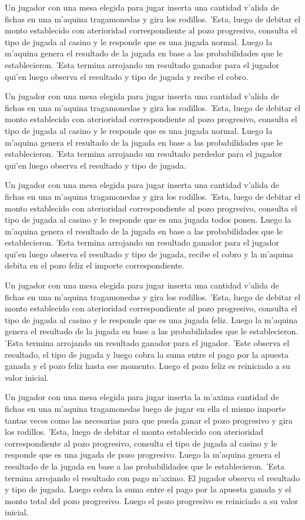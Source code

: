 \escenario
{
Un jugador con una mesa elegida para jugar inserta una cantidad v'alida de fichas en una m'aquina tragamonedas y gira los rodillos. 'Esta, luego de debitar el monto establecido con aterioridad correspondiente al pozo progresivo, consulta el tipo de jugada al casino y le responde que es una jugada normal. Luego la m'aquina genera el resultado de la jugada en base a las probabilidades que le establecieron. 'Esta termina arrojando un resultado ganador para el jugador qui'en luego observa el resultado y tipo de jugada y recibe el cobro.
}

\escenario
{
Un jugador con una mesa elegida para jugar inserta una cantidad v'alida de fichas en una m'aquina tragamonedas y gira los rodillos. 'Esta, luego de debitar el monto establecido con aterioridad correspondiente al pozo progresivo, consulta el tipo de jugada al casino y le responde que es una jugada normal. Luego la m'aquina genera el resultado de la jugada en base a las probabilidades que le establecieron. 'Esta termina arrojando un resultado perdedor para el jugador qui'en luego observa el resultado y tipo de jugada.
}

\escenario
{
Un jugador con una mesa elegida para jugar inserta una cantidad v'alida de fichas en una m'aquina tragamonedas y gira los rodillos. 'Esta, luego de debitar el monto establecido con aterioridad correspondiente al pozo progresivo, consulta el tipo de jugada al casino y le responde que es una jugada todos ponen. Luego la m'aquina genera el resultado de la jugada en base a las probabilidades que le establecieron. 'Esta termina arrojando un resultado ganador para el jugador qui'en luego observa el resultado y tipo de jugada, recibe el cobro y la m'aquina debita en el pozo feliz el importe correspondiente.
}

\escenario
{
Un jugador con una mesa elegida para jugar inserta una cantidad v'alida de fichas en una m'aquina tragamonedas y gira los rodillos. 'Esta, luego de debitar el monto establecido con aterioridad correspondiente al pozo progresivo, consulta el tipo de jugada al casino y le responde que es una jugada feliz. Luego la m'aquina genera el resultado de la jugada en base a las probabilidades que le establecieron. 'Esta termina arrojando un resultado ganador para el jugador. 'Este observa el resultado, el tipo de jugada y luego cobra la suma entre el pago por la apuesta ganada y el pozo feliz hasta ese momento. Luego el pozo feliz es reiniciado a su valor inicial. 
}

\escenario
{
Un jugador con una mesa elegida para jugar inserta la m'axima cantidad de fichas en una m'aquina tragamonedas luego de jugar en ella el mismo importe tantas veces como las necesarias para que pueda ganar el pozo progresivo y gira los rodillos. 'Esta, luego de debitar el monto establecido con aterioridad correspondiente al pozo progresivo, consulta el tipo de jugada al casino y le responde que es una jugada de pozo progresivo. Luego la m'aquina genera el resultado de la jugada en base a las probabilidades que le establecieron. 'Esta termina arrojando el resultado con pago m'aximo. El jugador observa el resultado y tipo de jugada. Luego cobra la suma entre el pago por la apuesta ganada y el monto total del pozo progresivo. Luego el pozo progresivo es reiniciado a su valor inicial.
}
